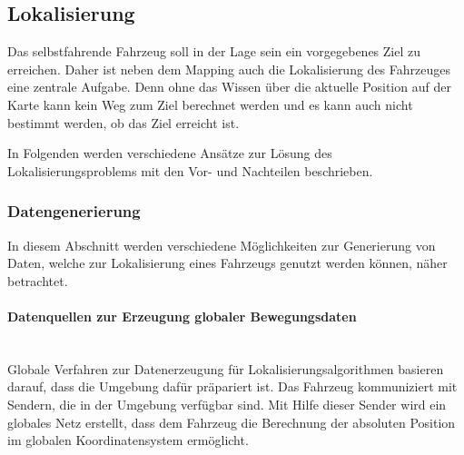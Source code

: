 \subsection{Lokalisierung}
Das selbstfahrende Fahrzeug soll in der Lage sein ein vorgegebenes Ziel zu erreichen. 
Daher ist neben dem Mapping auch die Lokalisierung des Fahrzeuges eine zentrale Aufgabe. 
Denn ohne das Wissen über die aktuelle Position auf der Karte kann kein Weg zum Ziel berechnet werden
und es kann auch nicht bestimmt werden, ob das Ziel erreicht ist.

In Folgenden werden verschiedene Ansätze zur Lösung des Lokalisierungsproblems mit den Vor- und Nachteilen beschrieben.

\subsubsection{Datengenerierung}
In diesem Abschnitt werden verschiedene Möglichkeiten zur Generierung von Daten, welche zur Lokalisierung eines Fahrzeugs genutzt werden können, näher betrachtet.

\paragraph{Datenquellen zur Erzeugung globaler Bewegungsdaten} \mbox{}\\
Globale Verfahren zur Datenerzeugung für Lokalisierungsalgorithmen basieren darauf, dass die Umgebung dafür präpariert ist.
Das Fahrzeug kommuniziert mit Sendern, die in der Umgebung verfügbar sind. 
Mit Hilfe dieser Sender wird ein globales Netz erstellt, dass dem Fahrzeug die Berechnung der absoluten Position im 
globalen Koordinatensystem ermöglicht.

